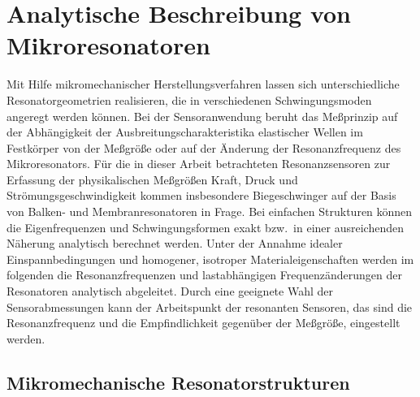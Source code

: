 \section[Analytische Beschreibungsweise]
{Analytische Beschreibung von Mikroresonatoren}
\label{analytischebeschreibungsweise}

Mit Hilfe mikromechanischer Herstellungsverfahren lassen sich
unterschiedliche Resonatorgeometrien realisieren, die in verschiedenen
Schwingungsmoden angeregt werden können. Bei der Sensoranwendung
beruht das Meßprinzip auf der Abhängigkeit der
Ausbreitungscharakteristika elastischer Wellen im Festkörper von
der Meßgröße oder auf der Änderung der Resonanzfrequenz des Mikroresonators.
Für die in dieser Arbeit betrachteten Resonanzsensoren zur Erfassung der
physikalischen Meßgrößen Kraft, Druck und Strömungsgeschwindigkeit kommen
insbesondere Biegeschwinger auf der Basis von Balken- und
Membranresonatoren in Frage. Bei
einfachen Strukturen können die Eigenfrequenzen und Schwingungsformen
exakt bzw.\ in einer ausreichenden Näherung analytisch berechnet
werden. Unter der
Annahme idealer Einspannbedingungen und homogener, isotroper
Materialeigenschaften werden im folgenden die Resonanzfrequenzen und
lastabhängigen Frequenzänderungen der Resonatoren analytisch abgeleitet.
Durch eine geeignete Wahl der Sensorabmessungen kann der Arbeitspunkt der
resonanten Sensoren, das sind die Resonanzfrequenz und die
Empfindlichkeit gegenüber der Meßgröße, eingestellt werden.


\subsection{Mikromechanische Resonatorstrukturen}
\label{resonatorstrukturen}

